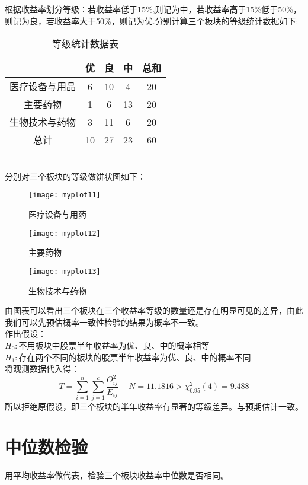 \documentclass[a4paper, 11pt]{article}
\begin{document}
\indent 根据收益率划分等级：若收益率低于15\%,则记为中，若收益率高于15\%低于50\%，则记为良，若收益率大于50\%，则记为优.分别计算三个板块的等级统计数据如下:\\
\begin{table}[!h]
	\centering
	\begin{tabular}{|c|c|c|c|c|}
		\hline
		&优&良&中&总和\\
		\hline
		医疗设备与用品&6&10&4&20\\
		\hline
		主要药物&1&6&13&20\\
		\hline
		生物技术与药物&3&11&6&20\\
		\hline
		总计&10&27&23&60\\
		\hline
	\end{tabular}
	\caption{等级统计数据表}
\end{table}\\
分别对三个板块的等级做饼状图如下：\\

\begin{figure}[!h]
	\centering
	\texttt{[image: myplot11]}
	\caption{医疗设备与用药}
\end{figure}
\begin{figure}[!h]
	\centering
	\texttt{[image: myplot12]}
	\caption{主要药物}
\end{figure}
\begin{figure}[!h]
	\centering
	\texttt{[image: myplot13]}
	\caption{生物技术与药物}
\end{figure}

由图表可以看出三个板块在三个收益率等级的数量还是存在明显可见的差异，由此我们可以先预估概率一致性检验的结果为概率不一致。\\
作出假设：\\
\indent $H_{0}:$不用板块中股票半年收益率为优、良、中的概率相等\\
\indent $H_{1}:$存在两个不同的板块的股票半年收益率为优、良、中的概率不同\\
将观测数据代入得：\\
$$T=\sum_{i=1}^{n} \sum_{j=1}^{c} \frac{O_{i j}^{2}}{E_{i j}}-N=11.1816>\chi^{2}_{0.95}(4)=9.488$$
所以拒绝原假设，即三个板块的半年收益率有显著的等级差异。与预期估计一致。\\
\section{中位数检验}
用平均收益率做代表，检验三个板块收益率中位数是否相同。
\end{document}
